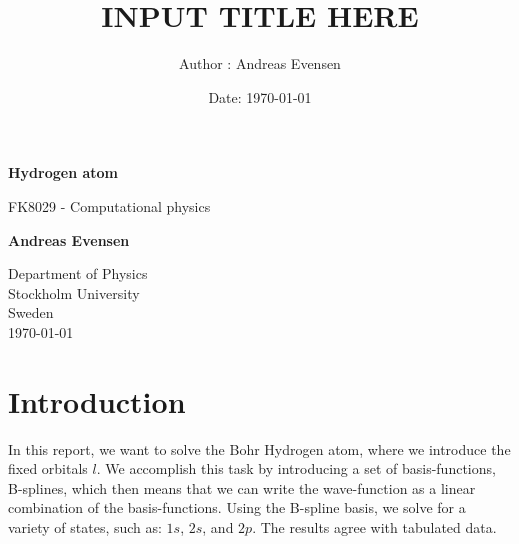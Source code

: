 \documentclass[a4paper]{article}
\title{INPUT TITLE HERE}
\author{Author : Andreas Evensen}
\date{Date: \today}
\begin{document}
\begin{titlepage}
    \begin{center}
        \vspace*{1cm}

        \Huge
        \textbf{Hydrogen atom}

        \vspace{0.5cm}
        \LARGE
        FK8029 - Computational physics

        \vspace{1.5cm}

        \textbf{Andreas Evensen}

        \vfill


        \Large
        Department of Physics\\
        Stockholm University\\
        Sweden\\
        \today
    \end{center}
\end{titlepage}

\section{Introduction}
In this report, we want to solve the Bohr Hydrogen atom, where we introduce the fixed orbitals $l$.
We accomplish this task by introducing a set of basis-functions, B-splines, which then means that we can write the wave-function as a linear combination of the basis-functions.
Using the B-spline basis, we solve for a variety of states, such as: $1s$, $2s$, and $2p$.
The results agree with tabulated data.


\tableofcontents
\newpage
\end{document}
